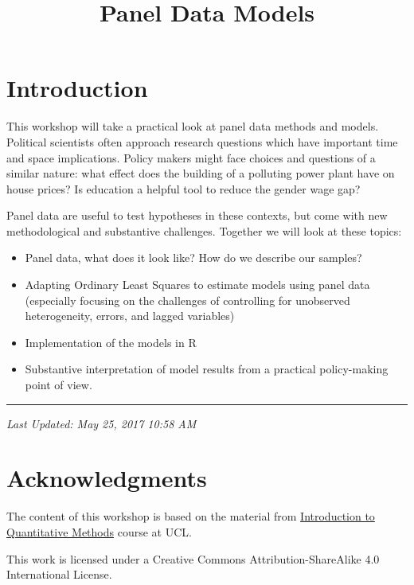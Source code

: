 \documentclass[]{article}
\title{Panel Data Models}
\author{}
\date{}
\providecommand{\tightlist}{%
  \setlength{\itemsep}{0pt}\setlength{\parskip}{0pt}}
\theoremstyle{definition}
\theoremstyle{definition}
\theoremstyle{remark}
\begin{document}
\maketitle

{
\setcounter{tocdepth}{2}
\tableofcontents
}
\section{Introduction}\label{introduction}

This workshop will take a practical look at panel data methods and
models. Political scientists often approach research questions which
have important time and space implications. Policy makers might face
choices and questions of a similar nature: what effect does the building
of a polluting power plant have on house prices? Is education a helpful
tool to reduce the gender wage gap?

Panel data are useful to test hypotheses in these contexts, but come
with new methodological and substantive challenges. Together we will
look at these topics:

\begin{itemize}
\tightlist
\item
  Panel data, what does it look like? How do we describe our samples?
\item
  Adapting Ordinary Least Squares to estimate models using panel data
  (especially focusing on the challenges of controlling for unobserved
  heterogeneity, errors, and lagged variables)
\item
  Implementation of the models in R
\item
  Substantive interpretation of model results from a practical
  policy-making point of view.
\end{itemize}

\begin{center}\rule{0.5\linewidth}{\linethickness}\end{center}

\emph{Last Updated: May 25, 2017 10:58 AM}

\section{Acknowledgments}\label{acknowledgments}

The content of this workshop is based on the material from
\href{https://uclspp.github.io/PUBLG100}{Introduction to Quantitative
Methods} course at UCL.

This work is licensed under a Creative Commons Attribution-ShareAlike
4.0 International License.
\end{document}

